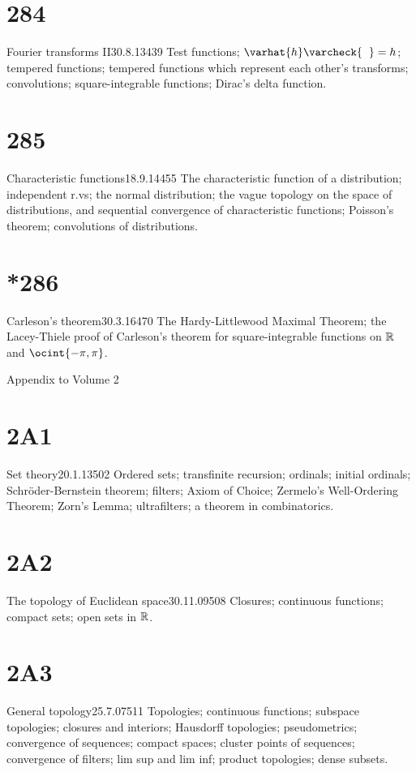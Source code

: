 \section{284}{Fourier transforms II}{30.8.13}{439}{}
{Test functions;  $\varhat{h}\varcheck{\phantom{h}}=h$;  tempered
functions;  tempered functions which represent each other's transforms;
convolutions;  square-integrable functions;  Dirac's delta function.}

\section{285}{Characteristic functions}{18.9.14}{455}{}
{The characteristic function of a distribution;  independent
r.vs;  the normal distribution;  the vague topology on the space of
distributions, and sequential convergence of characteristic functions;
Poisson's theorem;  convolutions of distributions.}

\section{*286}{Carleson's theorem}{30.3.16}{470}{}
{The Hardy-Littlewood Maximal Theorem;  the Lacey-Thiele proof of
Carleson's theorem for square-integrable functions on $\Bbb{R}$ and
$\ocint{-\pi,\pi}$.}


 Appendix to Volume 2


\section{2A1}{Set theory}{20.1.13}{502}{}
{Ordered sets;  transfinite recursion;  ordinals;  initial
ordinals;  Schr\"oder-\vthsp{}Bernstein theorem;  filters;  Axiom of
Choice;
Zermelo's Well-Ordering Theorem;  Zorn's Lemma;  ultrafilters;  a theorem
in combinatorics.}

\section{2A2}{The topology of Euclidean space}{30.11.09}{508}{}
{Closures;  continuous functions;  compact sets;  open sets in $\Bbb{R}$.}

\section{2A3}{General topology}{25.7.07}{511}{}
{Topologies;  continuous functions;  subspace topologies;
closures and interiors;
Hausdorff topologies;  pseudometrics;  convergence of sequences;
compact spaces;  cluster points of sequences;  convergence of filters;
lim sup and lim inf;  product topologies;  dense subsets.}

